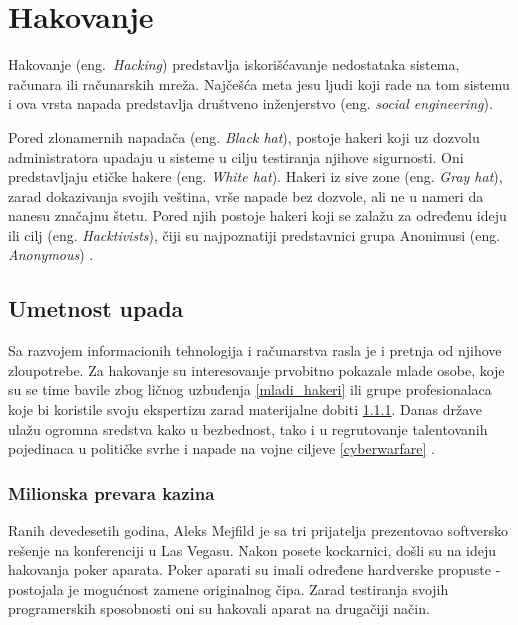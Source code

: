 \documentclass[a4paper]{article}
\begin{document}
\section{Hakovanje}
\label{hakovanje}

Hakovanje (eng.~{\em Hacking}) predstavlja iskorišćavanje nedostataka sistema, računara ili računarskih mreža. Najčešća meta jesu ljudi koji rade na tom sistemu i ova vrsta napada predstavlja društveno inženjerstvo (eng. \textit{social engineering}).

Pored zlonamernih napadača (eng. \textit{Black hat}), postoje hakeri koji uz dozvolu administratora upadaju u sisteme u cilju testiranja njihove sigurnosti. Oni predstavljaju etičke hakere (eng. \textit{White hat}). Hakeri iz sive zone (eng. \textit{Gray hat}), zarad dokazivanja svojih veština, vrše napade bez dozvole, ali ne u nameri da nanesu značajnu štetu. Pored njih postoje hakeri koji se zalažu za određenu ideju ili cilj (eng. \textit{Hacktivists}), čiji su najpoznatiji predstavnici grupa Anonimusi (eng. \textit{Anonymous}) \cite{hackers_hat}.
 
\subsection{Umetnost upada}
\label{sec:intrusion}

Sa razvojem informacionih tehnologija i računarstva rasla je i pretnja od njihove zloupotrebe. Za hakovanje su interesovanje prvobitno pokazale mlade osobe, koje su se time bavile zbog ličnog uzbuđenja \ref{mladi_hakeri} ili grupe profesionalaca koje bi koristile svoju ekspertizu zarad materijalne dobiti \ref{milionska_prevara_kazina}. Danas države ulažu ogromna sredstva kako u bezbednost, tako i u regrutovanje talentovanih pojedinaca u političke svrhe i napade na vojne ciljeve \ref{cyberwarfare} \cite{intrusion}.

\subsubsection{Milionska prevara kazina}
\label{milionska_prevara_kazina}

Ranih devedesetih godina, Aleks Mejfild je sa tri prijatelja prezentovao softversko rešenje na konferenciji u Las Vegasu. Nakon posete kockarnici, došli su na ideju hakovanja poker aparata. Poker aparati su imali određene hardverske propuste - postojala je mogućnost zamene originalnog čipa. Zarad testiranja svojih programerskih sposobnosti oni su hakovali aparat na drugačiji način.
\end{document}
